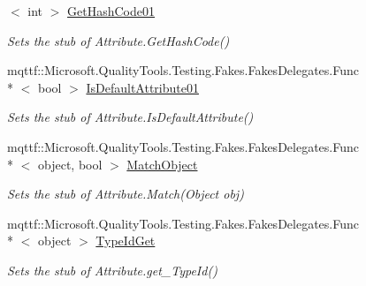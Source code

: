 \begin{DoxyCompactItemize}
$<$ int $>$ \hyperlink{class_system_1_1_runtime_1_1_remoting_1_1_proxies_1_1_fakes_1_1_stub_proxy_attribute_af8828422f0e5d05535b588913f5fe719}{Get\-Hash\-Code01}
\begin{DoxyCompactList}\small\item\em Sets the stub of Attribute.\-Get\-Hash\-Code()\end{DoxyCompactList}\item 
mqttf\-::\-Microsoft.\-Quality\-Tools.\-Testing.\-Fakes.\-Fakes\-Delegates.\-Func\\*
$<$ bool $>$ \hyperlink{class_system_1_1_runtime_1_1_remoting_1_1_proxies_1_1_fakes_1_1_stub_proxy_attribute_a482344f4e042b9cac25b9eaa2c33d675}{Is\-Default\-Attribute01}
\begin{DoxyCompactList}\small\item\em Sets the stub of Attribute.\-Is\-Default\-Attribute()\end{DoxyCompactList}\item 
mqttf\-::\-Microsoft.\-Quality\-Tools.\-Testing.\-Fakes.\-Fakes\-Delegates.\-Func\\*
$<$ object, bool $>$ \hyperlink{class_system_1_1_runtime_1_1_remoting_1_1_proxies_1_1_fakes_1_1_stub_proxy_attribute_a21c3da4e451e1b962c8e7b198a7772bb}{Match\-Object}
\begin{DoxyCompactList}\small\item\em Sets the stub of Attribute.\-Match(\-Object obj)\end{DoxyCompactList}\item 
mqttf\-::\-Microsoft.\-Quality\-Tools.\-Testing.\-Fakes.\-Fakes\-Delegates.\-Func\\*
$<$ object $>$ \hyperlink{class_system_1_1_runtime_1_1_remoting_1_1_proxies_1_1_fakes_1_1_stub_proxy_attribute_a463844c02686a34fa31032140cdaea45}{Type\-Id\-Get}
\begin{DoxyCompactList}\small\item\em Sets the stub of Attribute.\-get\-\_\-\-Type\-Id()\end{DoxyCompactList}\end{DoxyCompactItemize}
